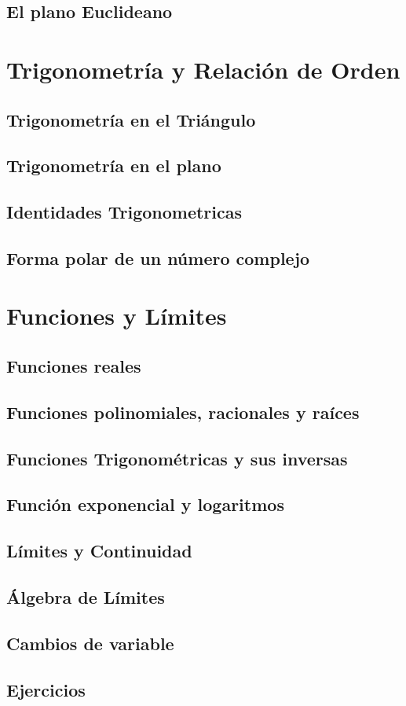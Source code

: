 \documentclass[11pt, twoside]{book}
\begin{document}
\section{El plano Euclideano}


\chapter{Trigonometría y Relación de Orden}
\section{Trigonometría en el Triángulo}
\section{Trigonometría en el plano}
\section{Identidades Trigonometricas}

\section{Forma polar de un número complejo}



\chapter{Funciones y Límites}
\section{Funciones reales}
\section{Funciones polinomiales, racionales y raíces}
\section{Funciones Trigonométricas y sus inversas}
\section{Función exponencial y logaritmos}
\section{Límites y Continuidad}
\section{Álgebra de Límites}
\section{Cambios de variable}
\section{Ejercicios}




\printbibliography%
\printindex

\begin{titlepage}

    \makebox[0pt][l]{\rule{1.3\textwidth}{0pt}}
    \par
    \pagecolor{ustmidgreen}

    \noindent
\end{titlepage}

\nopagecolor
\end{document}
